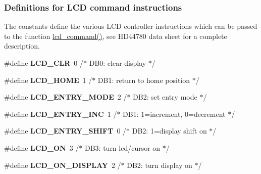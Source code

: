\subsubsection*{Definitions for L\+CD command instructions}
\label{_amgrpe1b1604cb195ab970ebf8b6b8b3e322f}%
The constants define the various L\+CD controller instructions which can be passed to the function \hyperlink{a00010_gaea9d14f02df06f948cb5a56776980826}{lcd\+\_\+command()}, see H\+D44780 data sheet for a complete description. \begin{DoxyCompactItemize}
\item 
\#define {\bfseries L\+C\+D\+\_\+\+C\+LR}~0 /$\ast$ D\+B0\+: clear display                  $\ast$/\hypertarget{a00010_ga459688213267d13ccfbeb2c9004988cb}{}\label{a00010_ga459688213267d13ccfbeb2c9004988cb}

\item 
\#define {\bfseries L\+C\+D\+\_\+\+H\+O\+ME}~1 /$\ast$ D\+B1\+: return to home position        $\ast$/\hypertarget{a00010_gae0e309ccad89222eb3457f2da9f2bb8d}{}\label{a00010_gae0e309ccad89222eb3457f2da9f2bb8d}

\item 
\#define {\bfseries L\+C\+D\+\_\+\+E\+N\+T\+R\+Y\+\_\+\+M\+O\+DE}~2 /$\ast$ D\+B2\+: set entry mode                 $\ast$/\hypertarget{a00010_gae5d757ddb6d94de8c82191b60b40e442}{}\label{a00010_gae5d757ddb6d94de8c82191b60b40e442}

\item 
\#define {\bfseries L\+C\+D\+\_\+\+E\+N\+T\+R\+Y\+\_\+\+I\+NC}~1 /$\ast$   D\+B1\+: 1=increment, 0=decrement     $\ast$/\hypertarget{a00010_gada766266a0be0d0040fbf86e23b58aa6}{}\label{a00010_gada766266a0be0d0040fbf86e23b58aa6}

\item 
\#define {\bfseries L\+C\+D\+\_\+\+E\+N\+T\+R\+Y\+\_\+\+S\+H\+I\+FT}~0 /$\ast$   D\+B2\+: 1=display shift on           $\ast$/\hypertarget{a00010_ga14d0c7fda147e0dc8cdaa4a2629b3532}{}\label{a00010_ga14d0c7fda147e0dc8cdaa4a2629b3532}

\item 
\#define {\bfseries L\+C\+D\+\_\+\+ON}~3 /$\ast$ D\+B3\+: turn lcd/cursor on             $\ast$/\hypertarget{a00010_ga47a809dfec086fdeca93dedc4fb83b44}{}\label{a00010_ga47a809dfec086fdeca93dedc4fb83b44}

\item 
\#define {\bfseries L\+C\+D\+\_\+\+O\+N\+\_\+\+D\+I\+S\+P\+L\+AY}~2 /$\ast$   D\+B2\+: turn display on              $\ast$/\hypertarget{a00010_gae84f634b0a1661c4d5bbaafd9397732a}{}\label{a00010_gae84f634b0a1661c4d5bbaafd9397732a}


\end{DoxyCompactItemize}
